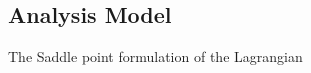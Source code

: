 \documentclass[../main.tex]{subfiles}
\begin{document}
\subsection{Analysis Model}\label{sec:analysis_model}



The Saddle point formulation of the Lagrangian





%
%
%
%
%
%
%
\end{document}
